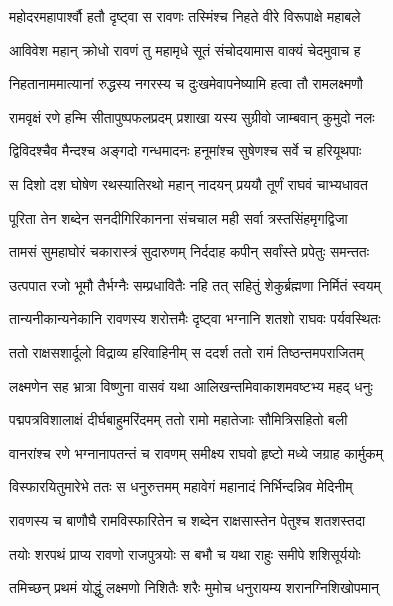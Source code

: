 
\twolineshloka
{महोदरमहापार्श्वौ हतौ दृष्ट्वा स रावणः}
{तस्मिंश्च निहते वीरे विरूपाक्षे महाबले} %

\twolineshloka
{आविवेश महान् क्रोधो रावणं तु महामृधे}
{सूतं संचोदयामास वाक्यं चेदमुवाच ह} %

\twolineshloka
{निहतानाममात्यानां रुद्धस्य नगरस्य च}
{दुःखमेवापनेष्यामि हत्वा तौ रामलक्ष्मणौ} %

\twolineshloka
{रामवृक्षं रणे हन्मि सीतापुष्पफलप्रदम्}
{प्रशाखा यस्य सुग्रीवो जाम्बवान् कुमुदो नलः} %

\twolineshloka
{द्विविदश्चैव मैन्दश्च अङ्गदो गन्धमादनः}
{हनूमांश्च सुषेणश्च सर्वे च हरियूथपाः} %

\twolineshloka
{स दिशो दश घोषेण रथस्यातिरथो महान्}
{नादयन् प्रययौ तूर्णं राघवं चाभ्यधावत} %

\twolineshloka
{पूरिता तेन शब्देन सनदीगिरिकानना}
{संचचाल मही सर्वा त्रस्तसिंहमृगद्विजा} %

\twolineshloka
{तामसं सुमहाघोरं चकारास्त्रं सुदारुणम्}
{निर्ददाह कपीन् सर्वांस्ते प्रपेतुः समन्ततः} %

\twolineshloka
{उत्पपात रजो भूमौ तैर्भग्नैः सम्प्रधावितैः}
{नहि तत् सहितुं शेकुर्ब्रह्मणा निर्मितं स्वयम्} %

\twolineshloka
{तान्यनीकान्यनेकानि रावणस्य शरोत्तमैः}
{दृष्ट्वा भग्नानि शतशो राघवः पर्यवस्थितः} %

\twolineshloka
{ततो राक्षसशार्दूलो विद्राव्य हरिवाहिनीम्}
{स ददर्श ततो रामं तिष्ठन्तमपराजितम्} %

\twolineshloka
{लक्ष्मणेन सह भ्रात्रा विष्णुना वासवं यथा}
{आलिखन्तमिवाकाशमवष्टभ्य महद् धनुः} %

\twolineshloka
{पद्मपत्रविशालाक्षं दीर्घबाहुमरिंदमम्}
{ततो रामो महातेजाः सौमित्रिसहितो बली} %

\twolineshloka
{वानरांश्च रणे भग्नानापतन्तं च रावणम्}
{समीक्ष्य राघवो हृष्टो मध्ये जग्राह कार्मुकम्} %

\twolineshloka
{विस्फारयितुमारेभे ततः स धनुरुत्तमम्}
{महावेगं महानादं निर्भिन्दन्निव मेदिनीम्} %

\twolineshloka
{रावणस्य च बाणौघै रामविस्फारितेन च}
{शब्देन राक्षसास्तेन पेतुश्च शतशस्तदा} %

\twolineshloka
{तयोः शरपथं प्राप्य रावणो राजपुत्रयोः}
{स बभौ च यथा राहुः समीपे शशिसूर्ययोः} %

\twolineshloka
{तमिच्छन् प्रथमं योद्धुं लक्ष्मणो निशितैः शरैः}
{मुमोच धनुरायम्य शरानग्निशिखोपमान्} %

